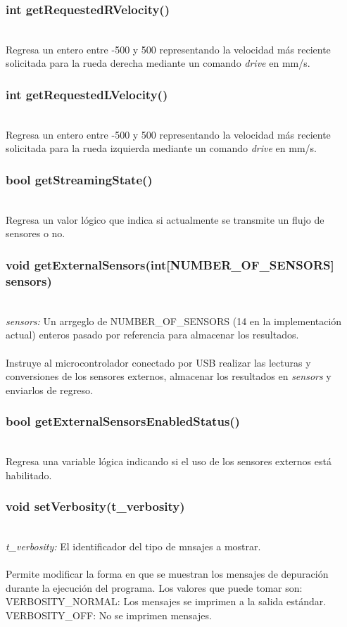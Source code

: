 \documentclass[letterpaper]{book}
\begin{document}
\subsubsection{int getRequestedRVelocity()}\mbox{}\\
Regresa un entero entre -500 y 500 representando la velocidad más reciente solicitada para la rueda derecha mediante un comando \emph{drive} en mm/s.\\
\subsubsection{int getRequestedLVelocity()}\mbox{}\\
Regresa un entero entre -500 y 500 representando la velocidad más reciente solicitada para la rueda izquierda mediante un comando \emph{drive} en mm/s.\\
\subsubsection{bool getStreamingState()}\mbox{}\\
Regresa un valor lógico que indica si actualmente se transmite un flujo de sensores o no.\\
\subsubsection{void getExternalSensors(int[NUMBER\_OF\_SENSORS] sensors)}\mbox{}\\
\emph{sensors: }Un arrgeglo de NUMBER\_OF\_SENSORS (14 en la implementación actual) enteros pasado por referencia para almacenar los resultados.\\\\
Instruye al microcontrolador conectado por USB realizar las lecturas y conversiones de los sensores externos, almacenar los resultados en \emph{sensors} y enviarlos de regreso.\\
\subsubsection{bool getExternalSensorsEnabledStatus()}\mbox{}\\
Regresa una variable lógica indicando si el uso de los sensores externos está habilitado.\\
\subsubsection{void setVerbosity(t\_verbosity)}\mbox{}\\
\emph{t\_verbosity: }El identificador del tipo de mnsajes a mostrar.\\\\
Permite modificar la forma en que se muestran los mensajes de depuración durante la ejecución del programa. Los valores que puede tomar son:\\
VERBOSITY\_NORMAL: Los mensajes se imprimen a la salida estándar.\\
VERBOSITY\_OFF: No se imprimen mensajes.\\
\end{document}
